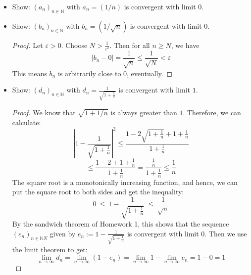 \begin{example}
\begin{itemize}
	\item Show: $(a_{n})_{n \in \mathbb{N}}$ with $a_n = (1/n)$ is convergent with limit $0$.
	\item Show: $(b_{n})_{n \in \mathbb{N}}$ with $b_n = (1/\sqrt{n})$ is convergent with limit $0$.
		\begin{proof}
			Let $\varepsilon > 0$. Choose $N > \frac{1}{\varepsilon^2}$. Then for all $n \geq N$, we have
				$$
					|b_n - 0| = \frac{1}{\sqrt{n}} \leq \frac{1}{\sqrt{N}} < \varepsilon 
				$$
			This means $b_n$ is arbitrarily close to $0$, eventually.
		\end{proof}
	\item Show: $(d_{n})_{n \in \mathbb{N}}$ with $\displaystyle d_n = \frac{1}{\sqrt{1 + \frac{1}{n}}}$ is convergent with limit $1$.
			\begin{proof}
			We know that $\sqrt{1 + 1/n}$ is always greater than $1$. Therefore, we can calculate:
				$$
				|1 - \frac{1}{\sqrt{1 + \frac{1}{n}}} |^2  \leq 
				\frac{ 1- 2 \sqrt{1 + \frac{1}{n}} + 1 + \frac{1}{n}}{1 + \frac{1}{n}} 
				$$
				$$
				\leq		\frac{ 1- 2 + 1 + \frac{1}{n}}{1 + \frac{1}{n}}		= 	
				\frac{ \frac{1}{n}}{1 + \frac{1}{n}} \leq \frac{1}{n}
				$$
			The square root is a monotonically increasing function, and hence, we can put the square root to both
			sides and get the inequality:
				$$
					0 ~\leq~ 1 - \frac{1}{\sqrt{1 + \frac{1}{n}}} ~\leq~ \frac{1}{\sqrt{n}}
				$$
			By the sandwich theorem of Homework 1, this shows that the sequence $(e_n)_{n \in \mathbb{N}N}$ given by
			$e_n := 1 - \frac{1}{\sqrt{1 + \frac{1}{n}}}$ is convergent with limit $0$. Then we use
			the limit theorem to get:
				$$
					\lim_{n \rightarrow \infty} d_n = \lim_{n \rightarrow \infty} (1 - e_n) = 
					\lim_{n \rightarrow \infty} 1 - \lim_{n \rightarrow \infty} e_n = 1 - 0 = 1
				$$
		\end{proof}
\end{itemize}
\end{example}



